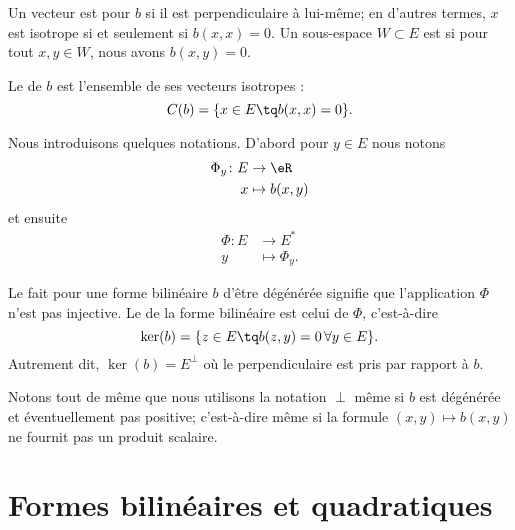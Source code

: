 \begin{definition}[Isotropie]   \label{DefVKMnUEM}
    Un vecteur est  pour \( b\) si il est perpendiculaire à lui-même; en d'autres termes, \( x\) est isotrope si et seulement si \( b(x,x)=0\). Un sous-espace \( W\subset E\) est  si pour tout \( x,y\in W\), nous avons \( b(x,y)=0\).

    Le  de \( b\) est l'ensemble de ses vecteurs isotropes :
    \begin{equation}
        C(b)=\{ x\in E\tq b(x,x)=0 \}.
    \end{equation}
\end{definition}
Nous introduisons quelques notations. D'abord pour \( y\in E\) nous notons
\begin{equation}
    \begin{aligned}
        \Phi_y\colon E&\to \eR \\
        x&\mapsto b(x,y)
    \end{aligned}
\end{equation}
et ensuite
\begin{equation}
    \begin{aligned}
        \Phi\colon E&\to E^* \\
        y&\mapsto \Phi_y.
    \end{aligned}
\end{equation}
\begin{definition}
    Le fait pour une forme bilinéaire \( b\) d'être dégénérée signifie que l'application \( \Phi\) n'est pas injective. Le  de la forme bilinéaire est celui de \( \Phi\), c'est-à-dire
    \begin{equation}
        \ker(b)=\{ z\in E\tq b(z,y)=0\,\forall y\in E \}.
    \end{equation}
    Autrement dit, \( \ker(b)=E^{\perp}\) où le perpendiculaire est pris par rapport à \( b\).
\end{definition}
Notons tout de même que nous utilisons la notation \( \perp\) même si \( b\) est dégénérée et éventuellement pas positive; c'est-à-dire même si la formule \( (x,y)\mapsto b(x,y)\) ne fournit pas un produit scalaire.


\section{Formes bilinéaires et quadratiques}


